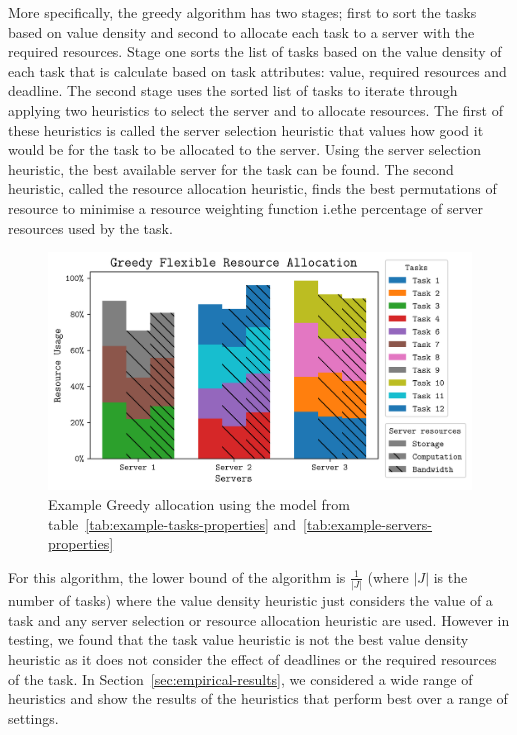 More specifically, the greedy algorithm has two stages; first to sort the tasks based on value density and second to
allocate each task to a server with the required resources. Stage one sorts the list of tasks based on the value
density of each task that is calculate based on task attributes: value, required resources and deadline. The second
stage uses the sorted list of tasks to iterate through applying two heuristics to select the server and to allocate
resources. The first of these heuristics is called the server selection heuristic that values how good it would be
for the task to be allocated to the server. Using the server selection heuristic, the best available server for the
task can be found. The second heuristic, called the resource allocation heuristic, finds the best permutations of
resource to minimise a resource weighting function i.e\. the percentage of server resources used by the task.

\begin{figure}
    \centering
    \includegraphics[width=\linewidth]{figs/allocation/greedy_flexible_resource_allocation.png}
    \caption{Example Greedy allocation using the model from table~\ref{tab:example-tasks-properties}
    and~\ref{tab:example-servers-properties}}
    \label{fig:example-greedy-allocation}
\end{figure}

For this algorithm, the lower bound of the algorithm is $\frac{1}{\left|J\right|}$ (where $\left|J\right|$ is the
number of tasks) where the value density heuristic just considers the value of a task and any server selection or
resource allocation heuristic are used. However in testing, we found that the task value heuristic is not the best
value density heuristic as it does not consider the effect of deadlines or the required resources of the task. In
Section~\ref{sec:empirical-results}, we considered a wide range of heuristics and show the results of the heuristics
that perform best over a range of settings.

